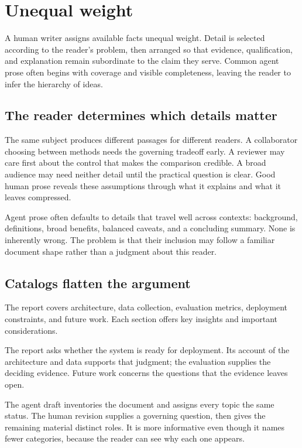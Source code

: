 \section{Unequal weight}
\label{sec:principles}

A human writer assigns available facts unequal weight. Detail is selected
according to the reader's problem, then arranged so that evidence,
qualification, and explanation remain subordinate to the claim they serve.
Common agent prose often begins with coverage and visible completeness,
leaving the reader to infer the hierarchy of ideas.

\subsection{The reader determines which details matter}

The same subject produces different passages for different readers. A
collaborator choosing between methods needs the governing tradeoff early. A
reviewer may care first about the control that makes the comparison credible.
A broad audience may need neither detail until the practical question is
clear. Good human prose reveals these assumptions through what it explains and
what it leaves compressed.

Agent prose often defaults to details that travel well across contexts:
background, definitions, broad benefits, balanced caveats, and a concluding
summary. None is inherently wrong. The problem is that their inclusion may
follow a familiar document shape rather than a judgment about this reader.

\subsection{Catalogs flatten the argument}

\agentdraft

The report covers architecture, data collection, evaluation metrics,
deployment constraints, and future work. Each section offers key insights and
important considerations.

\humanrevision

The report asks whether the system is ready for deployment. Its account of the
architecture and data supports that judgment; the evaluation supplies the
deciding evidence. Future work concerns the questions that the evidence leaves
open.

The agent draft inventories the document and assigns every topic the same
status. The human revision supplies a governing question, then gives the
remaining material distinct roles. It is more informative even though it names
fewer categories, because the reader can see why each one appears.

